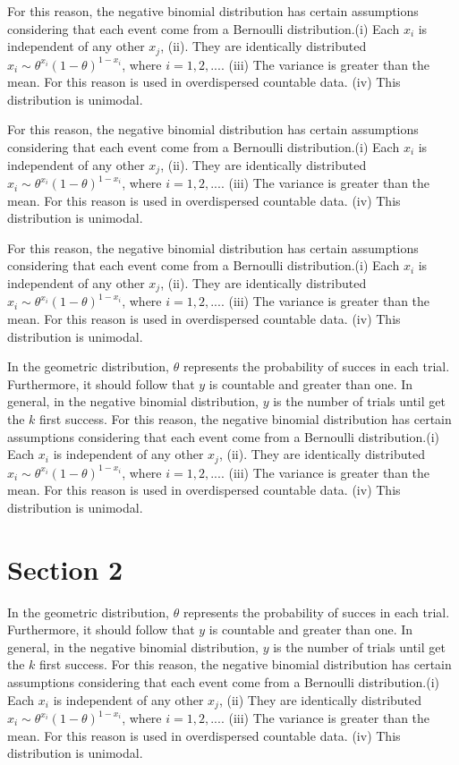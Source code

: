 \documentclass[11pt, a4paper, top=3.5cm,bottom=3.5cm, right=3cm,left=3cm]{SimpleNotes}
\begin{document}
For this reason, the negative binomial distribution has certain assumptions considering that each event come from a Bernoulli distribution.(i) Each $x_i$ is independent of any other $x_j$, (ii). They are identically distributed $x_i\sim\theta^{x_i}(1-\theta)^{1-x_i}$, where $i =1,2,...$. (iii) The variance is greater than the mean. For this reason is used in overdispersed countable data. (iv) This distribution is unimodal.

For this reason, the negative binomial distribution has certain assumptions considering that each event come from a Bernoulli distribution.(i) Each $x_i$ is independent of any other $x_j$, (ii). They are identically distributed $x_i\sim\theta^{x_i}(1-\theta)^{1-x_i}$, where $i =1,2,...$. (iii) The variance is greater than the mean. For this reason is used in overdispersed countable data. (iv) This distribution is unimodal.

For this reason, the negative binomial distribution has certain assumptions considering that each event come from a Bernoulli distribution.(i) Each $x_i$ is independent of any other $x_j$, (ii). They are identically distributed $x_i\sim\theta^{x_i}(1-\theta)^{1-x_i}$, where $i =1,2,...$. (iii) The variance is greater than the mean. For this reason is used in overdispersed countable data. (iv) This distribution is unimodal.

In the geometric distribution, $\theta$ represents the probability of succes in each trial. Furthermore, it should follow that $y$ is countable and greater than one. In general, in the negative binomial distribution, $y$ is the number of trials until get the $k$ first success. For this reason, the negative binomial distribution has certain assumptions considering that each event come from a Bernoulli distribution.(i) Each $x_i$ is independent of any other $x_j$, (ii). They are identically distributed $x_i\sim\theta^{x_i}(1-\theta)^{1-x_i}$, where $i =1,2,...$. (iii) The variance is greater than the mean. For this reason is used in overdispersed countable data. (iv) This distribution is unimodal.
\section{Section 2}
In the geometric distribution, $\theta$ represents the probability of succes in each trial. Furthermore, it should follow that $y$ is countable and greater than one. In general, in the negative binomial distribution, $y$ is the number of trials until get the $k$ first success. For this reason, the negative binomial distribution has certain assumptions considering that each event come from a Bernoulli distribution.(i) Each $x_i$ is independent of any other $x_j$, (ii) They are identically distributed $x_i\sim\theta^{x_i}(1-\theta)^{1-x_i}$, where $i =1,2,...$. (iii) The variance is greater than the mean. For this reason is used in overdispersed countable data. (iv) This distribution is unimodal.
\end{document}
